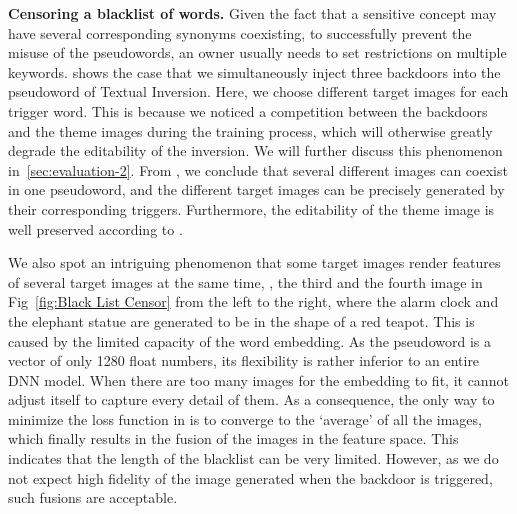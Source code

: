 \vspace{1em}
\noindent \textbf{Censoring a blacklist of words.} Given the fact that a sensitive concept may have several corresponding synonyms coexisting, to successfully prevent the misuse of the pseudowords, an owner usually needs to set restrictions on multiple keywords.  shows the case that we simultaneously inject three backdoors into the pseudoword of Textual Inversion. Here, we choose different target images for each trigger word. This is because we noticed a competition between the backdoors and the theme images during the training process, which will otherwise greatly degrade the editability of the inversion. We will further discuss this phenomenon in~\cref{sec:evaluation-2}. From , we conclude that several different images can coexist in one pseudoword, and the different target images can be precisely generated by their corresponding triggers. Furthermore, the editability of the theme image is well preserved according to .



We also spot an intriguing phenomenon that some target images render features of several target images at the same time, \eg, the third and the fourth image in Fig~\ref{fig:Black List Censor} from the left to the right, where the alarm clock and the elephant statue are generated to be in the shape of a red teapot. This is caused by the limited capacity of the word embedding. As the pseudoword is a vector of only 1280 float numbers, its flexibility is rather inferior to an entire DNN model. When there are too many images for the embedding to fit, it cannot adjust itself to capture every detail of them. As a consequence, the only way to minimize the loss function in  is to converge to the `average' of all the images, which finally results in the fusion of the images in the feature space. This indicates that the length of the blacklist can be very limited. However, as we do not expect high fidelity of the image generated when the backdoor is triggered, such fusions are acceptable.



\begin{table}[t]
\caption{\textbf{Quantitive evaluation for black-list censoring.} we did the experiment on case \one\space to set a 3-word black list  }
\label{table:Black List Censor}
\centering
{}
    \vspace{1ex}
\end{table}

